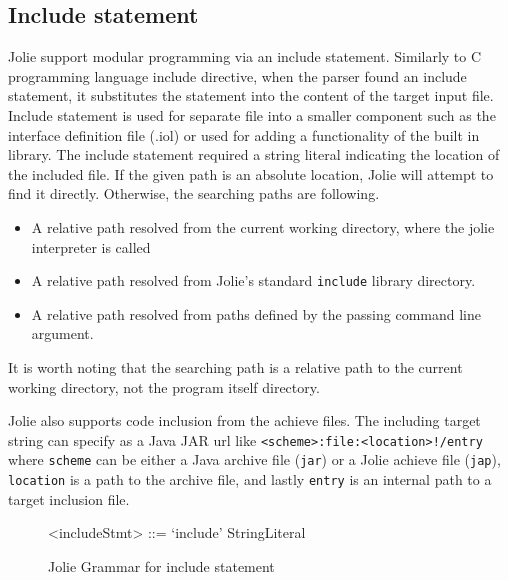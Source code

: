 \subsection{Include statement}
\label{sec:jolie-include}

Jolie support modular programming via an include statement. Similarly to C programming language include directive, when the parser found an include statement, it substitutes the statement into the content of the target input file. Include statement is used for separate file into a smaller component such as the interface definition file (.iol) or used for adding a functionality of the built in library. The include statement required a string literal indicating the location of the included file. If the given path is an absolute location, Jolie will attempt to find it directly. Otherwise, the searching paths are following.

\begin{itemize}
    \item A relative path resolved from the current working directory, where the jolie interpreter is called
    \item A relative path resolved from Jolie's standard \texttt{include} library directory.
    \item A relative path resolved from paths defined by the passing command line argument.
\end{itemize}

It is worth noting that the searching path is a relative path to the current working directory, not the program itself directory.

Jolie also supports code inclusion from the achieve files.
The including target string can specify as a Java JAR url like \texttt{<scheme>:file:<location>\newline!/{entry}} where \texttt{scheme} can be either a Java archive file (\texttt{jar}) or a Jolie achieve file (\texttt{jap}), \texttt{location} is a path to the archive file, and lastly \texttt{entry} is an internal path to a target inclusion file.

\begin{figure}[h]
    \begin{framed}
        \begin{grammar}
            <includeStmt> ::= `include' StringLiteral
        \end{grammar}
    \end{framed}
    \caption{Jolie Grammar for include statement}
    \label{fig:jolie-definition}
\end{figure}

